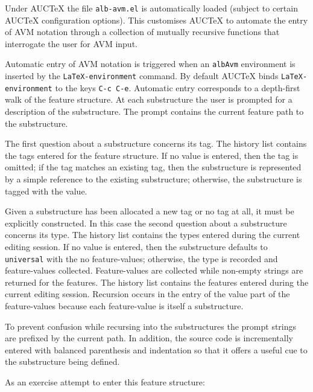 \documentclass[11pt,a4paper,oneside]{article}
\newcommand{\AUCTeX}[0]{AUC\TeX{}}
\begin{document}
Under \AUCTeX{} the file \texttt{alb-avm.el} is automatically loaded
(subject to certain \AUCTeX{} configuration options).  This customises
\AUCTeX{} to automate the entry of AVM notation through a collection of
mutually recursive functions that interrogate the user for AVM input.

Automatic entry of AVM notation is triggered when an \texttt{albAvm}
environment is inserted by the \texttt{LaTeX-environment} command.  By
default \AUCTeX{} binds \texttt{LaTeX-environment} to the keys \texttt{C-c
  C-e}.  Automatic entry corresponds to a depth-first walk of the
feature structure.  At each substructure the user is prompted for
a description of the substructure.  The prompt contains the current
feature path to the substructure.

The first question about a substructure concerns its tag.  The history
list contains the tags entered for the feature structure.  If no value
is entered, then the tag is omitted; if the tag matches an existing tag,
then the substructure is represented by a simple reference to the
existing substructure; otherwise, the substructure is tagged with the
value.

Given a substructure has been allocated a new tag or no tag at all, it
must be explicitly constructed.  In this case the second question about
a substructure concerns its type.  The history list contains the types
entered during the current editing session.  If no value is entered,
then the substructure defaults to \texttt{universal} with the no
feature-values; otherwise, the type is recorded and feature-values
collected.  Feature-values are collected while non-empty strings are
returned for the features.  The history list contains the features
entered during the current editing session.  Recursion occurs in the
entry of the value part of the feature-values because each feature-value
is itself a substructure.

To prevent confusion while recursing into the substructures the prompt
strings are prefixed by the current path.  In addition, the source code
is incrementally entered with balanced parenthesis and indentation so
that it offers a useful cue to the substructure being defined.

As an exercise attempt to enter this feature structure:

\begin{quote}
  \begin{albAvm}
  \end{albAvm}
\end{quote}
\end{document}
